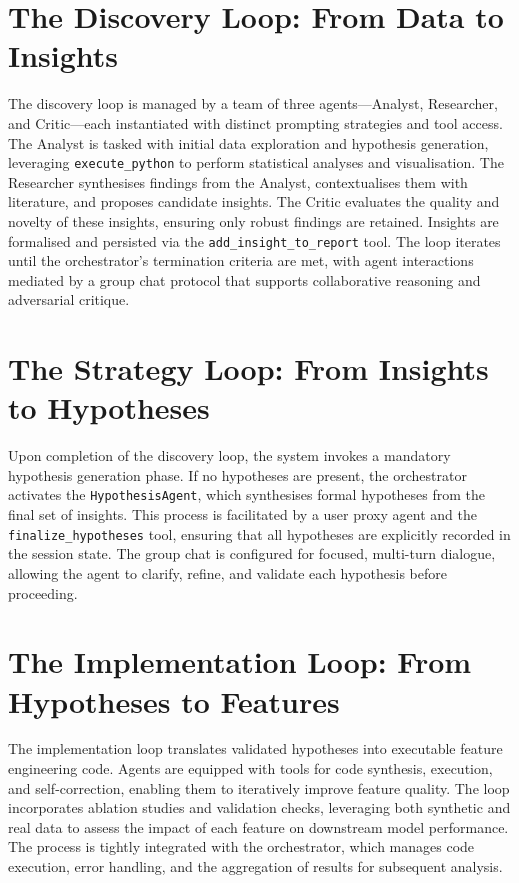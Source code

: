 \section{The Discovery Loop: From Data to Insights}
The discovery loop is managed by a team of three agents—Analyst, Researcher, and Critic—each instantiated with distinct prompting strategies and tool access. The Analyst is tasked with initial data exploration and hypothesis generation, leveraging \texttt{execute\_python} to perform statistical analyses and visualisation. The Researcher synthesises findings from the Analyst, contextualises them with literature, and proposes candidate insights. The Critic evaluates the quality and novelty of these insights, ensuring only robust findings are retained. Insights are formalised and persisted via the \texttt{add\_insight\_to\_report} tool. The loop iterates until the orchestrator's termination criteria are met, with agent interactions mediated by a group chat protocol that supports collaborative reasoning and adversarial critique.

\section{The Strategy Loop: From Insights to Hypotheses}
Upon completion of the discovery loop, the system invokes a mandatory hypothesis generation phase. If no hypotheses are present, the orchestrator activates the \texttt{HypothesisAgent}, which synthesises formal hypotheses from the final set of insights. This process is facilitated by a user proxy agent and the \texttt{finalize\_hypotheses} tool, ensuring that all hypotheses are explicitly recorded in the session state. The group chat is configured for focused, multi-turn dialogue, allowing the agent to clarify, refine, and validate each hypothesis before proceeding.

\section{The Implementation Loop: From Hypotheses to Features}
The implementation loop translates validated hypotheses into executable feature engineering code. Agents are equipped with tools for code synthesis, execution, and self-correction, enabling them to iteratively improve feature quality. The loop incorporates ablation studies and validation checks, leveraging both synthetic and real data to assess the impact of each feature on downstream model performance. The process is tightly integrated with the orchestrator, which manages code execution, error handling, and the aggregation of results for subsequent analysis.

